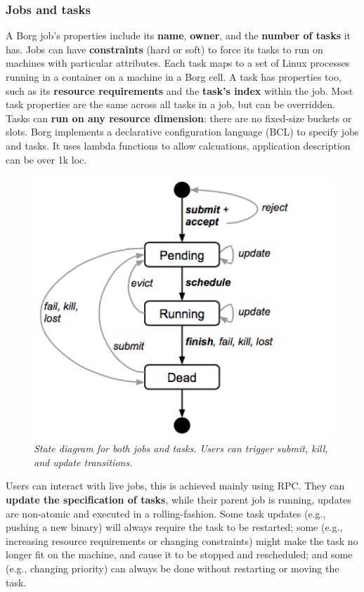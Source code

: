 		\subsubsection{Jobs and tasks}
		A Borg job’s properties include its \textbf{name}, \textbf{owner}, and the \textbf{number of tasks} it has. Jobs can have \textbf{constraints} (hard or soft) to force its tasks to run on machines with particular attributes.\newline
		\newline
		Each task maps to a set of Linux processes running in a container on a machine in a Borg cell.\newline
		\newline
		A task has properties too, such as its \textbf{resource requirements} and the \textbf{task’s index} within the job. Most task properties are the same across all tasks in a job, but can be overridden.\newline
		Tasks can \textbf{run on any resource dimension}: there are no fixed-size buckets or
		slots.\newline
		\newline
		Borg implements a declarative configuration language (BCL) to specify jobs and tasks. It uses lambda functions to allow calcuations, application description can be over 1k loc.\newline
		\newline
		\begin{figure}[H]
			\centering
			\includegraphics[width=0.5\linewidth]{images/borg_job_state_diagram.png}
			\caption{\textit{State diagram for both jobs and tasks. Users can trigger submit, kill, and update transitions.}}
		\end{figure}
		Users can interact with live jobs, this is achieved mainly using RPC. They can \textbf{update the specification of tasks}, while their parent job is running, updates are non-atomic and executed in a rolling-fashion.\newline
		Some task updates (e.g., pushing a new binary) will always require the task to be restarted; some (e.g., increasing resource requirements or changing constraints) might make the task no longer fit on the machine, and cause it to be stopped and rescheduled; and some (e.g., changing priority) can always be done without restarting or moving the task.
